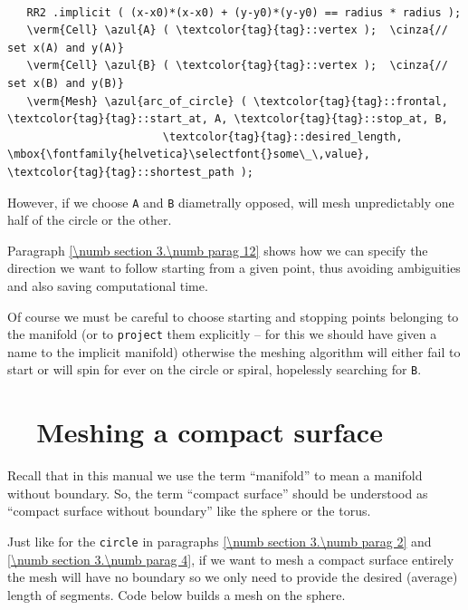 \begin{Verbatim}[commandchars=\\\{\},formatcom=\small\tt,
   baselinestretch=0.94,framesep=2mm                      ]

   RR2 .implicit ( (x-x0)*(x-x0) + (y-y0)*(y-y0) == radius * radius );
   \verm{Cell} \azul{A} ( \textcolor{tag}{tag}::vertex );  \cinza{// set x(A) and y(A)}
   \verm{Cell} \azul{B} ( \textcolor{tag}{tag}::vertex );  \cinza{// set x(B) and y(B)}
   \verm{Mesh} \azul{arc_of_circle} ( \textcolor{tag}{tag}::frontal, \textcolor{tag}{tag}::start_at, A, \textcolor{tag}{tag}::stop_at, B,
                        \textcolor{tag}{tag}::desired_length, \mbox{\fontfamily{helvetica}\selectfont{}some\_\,value}, \textcolor{tag}{tag}::shortest_path );
\end{Verbatim}

However, if we choose {\small\tt A} and {\small\tt B} diametrally opposed, {\maniFEM} will
mesh unpredictably one half of the circle or the other.

Paragraph \ref{\numb section 3.\numb parag 12} shows how we can specify the direction we
want to follow starting from a given point, thus avoiding ambiguities and also saving
computational time.

Of course we must be careful to choose starting and stopping points belonging to the manifold
(or to {\small\tt project} them explicitly -- for this we should have given a name to the
implicit manifold) otherwise the meshing algorithm will either fail to start or will spin
for ever on the circle or spiral, hopelessly searching for {\small\tt B}.


\section{~~Meshing a compact surface}\label{\numb section 3.\numb parag 6}

Recall that in this manual we use the term ``manifold'' to mean a manifold without boundary.
So, the term ``compact surface'' should be understood as ``compact surface without boundary''
like the sphere or the torus.

Just like for the {\small\tt circle} in paragraphs \ref{\numb section 3.\numb parag 2} and
\ref{\numb section 3.\numb parag 4}, if we want to mesh a compact surface entirely
the mesh will have no boundary so we only need to provide the desired (average) length
of segments.
Code below builds a mesh on the sphere.

